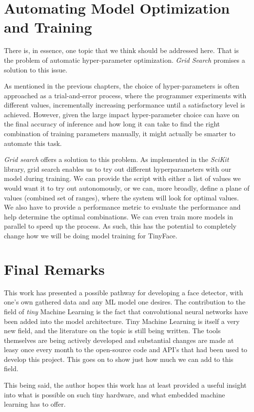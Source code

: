 \section{Automating Model Optimization and Training}
There is, in essence, one topic that we think should be addressed here. That is the problem of automatic hyper-parameter optimization. \textit{Grid Search} promises a solution to this issue. \par
As mentioned in the previous chapters, the choice of hyper-parameters is often approached as a trial-and-error process, where the programmer experiments with different values, incrementally increasing performance until a satisfactory level is achieved. However, given the large impact hyper-parameter choice can have on the final accuracy of inference and how long it can take to find the right combination of training parameters manually, it might actually be smarter to automate this task. \par
\textit{Grid search} offers a solution to this problem. \cite{scikit_grid_search} As implemented in the \textit{SciKit} library, grid search enables us to try out different hyperparameters with our model during training. We can provide the script with either a list of values we would want it to try out autonomously, or we can, more broadly, define a plane of values (combined set of ranges), where the system will look for optimal values. We also have to provide a performance metric to evaluate the performance and help determine the optimal combinations. We can even train more models in parallel to speed up the process. As such, this has the potential to completely change how we will be doing model training for TinyFace.
\section{Final Remarks}
This work has presented a possible pathway for developing a face detector, with one's own gathered data and any ML model one desires. The contribution to the field of \textit{tiny} Machine Learning is the fact that convolutional neural networks have been added into the model architecture. Tiny Machine Learning is itself a very new field, and the literature on the topic is still being written. The tools themselves are being actively developed and substantial changes are made at leasy once every month to the open-source code and API's that had been used to develop this project. This goes on to show just how much we can add to this field. \par
This being said, the author hopes this work has at least provided a useful insight into what is possible on such tiny hardware, and what embedded machine learning has to offer.